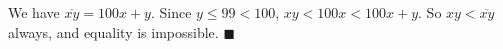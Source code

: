 We have $\overline{xy}=100x+y$. Since $y\le99<100$, $xy<100x<100x+y$. So $xy<\overline{xy}$ always, and equality is impossible. $\blacksquare$
